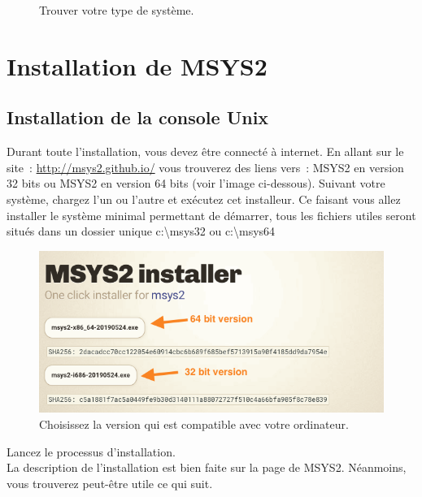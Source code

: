 \documentclass{article}
\begin{document}
\begin{figure}[H]
\begin{subfigure}[c]{0.5\textwidth}
\end{subfigure}
\caption{Trouver votre type de système.}
\end{figure}

\section{Installation de MSYS2}
\subsection{Installation de la console Unix}
Durant toute l'installation, vous devez être connecté à internet. En allant sur le site : \href{http://msys2.github.io/}{http://msys2.github.io/} vous trouverez des liens vers : MSYS2 en version 32 bits ou MSYS2 en version 64 bits (voir l'image ci-dessous). Suivant votre système, chargez l'un ou l'autre et exécutez cet installeur. Ce faisant vous allez installer le système minimal permettant de démarrer, tous les fichiers utiles seront situés dans un dossier unique c:\textbackslash msys32 ou c:\textbackslash msys64
\begin{figure}[H]
\center
\includegraphics[width=1\textwidth]{Plots/Msys2_0.png}
\caption{Choisissez la version qui est compatible avec votre ordinateur.}
\end{figure}
Lancez le processus d'installation.\\
La description de l'installation est bien faite sur la page de MSYS2. Néanmoins, vous trouverez peut-être utile ce qui suit.
\end{document}
